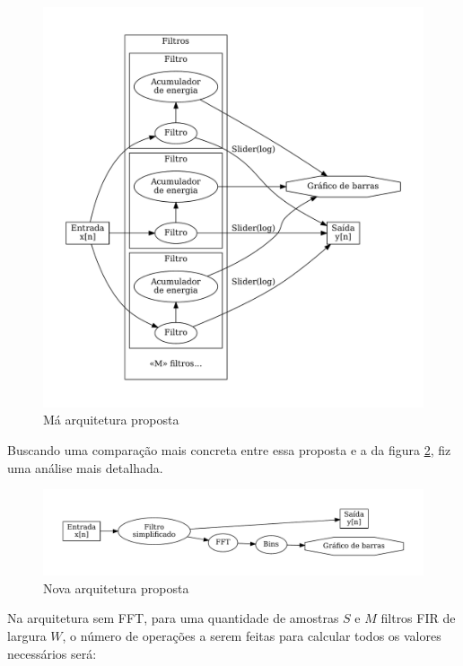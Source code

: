 \begin{figure}[h]
    \centering
    \includegraphics[scale=0.5]{fig/arquitetura.pdf}
    \caption{Má arquitetura proposta}
    \label{fig:arquiteturar}
\end{figure}

\break

Buscando uma comparação mais concreta entre essa proposta e a da figura \ref{fig:arquitetura}, fiz uma análise mais detalhada.

\begin{figure}[h]
    \centering
    \includegraphics[scale=0.5]{fig/arquiteturafft.pdf}
    \caption{Nova arquitetura proposta}
    \label{fig:arquitetura}
\end{figure}

Na arquitetura sem FFT, para uma quantidade de amostras $S$ e $M$ filtros FIR de largura $W$, o número de operações a serem feitas para calcular todos os valores necessários será:

